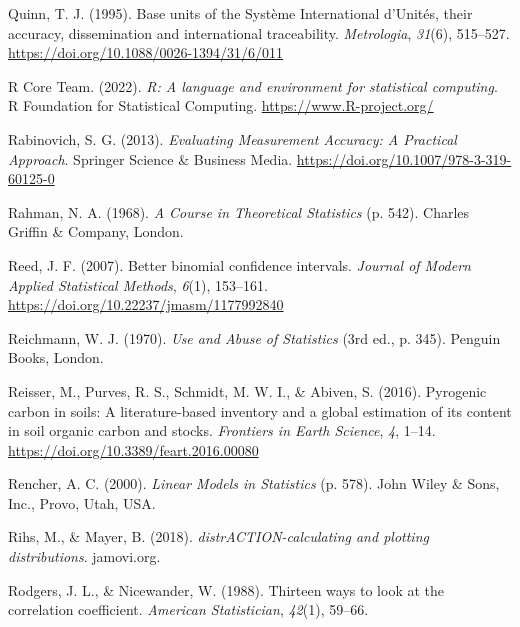 \documentclass[
  openany]{krantz}
\newlength{\cslhangindent}
\newlength{\cslentryspacingunit} %
\newenvironment{CSLReferences}[2] %
 {%
  \setlength{\parindent}{0pt}
  \ifodd #1
  \let\oldpar\par
  \def\par{\hangindent=\cslhangindent\oldpar}
  \fi
  \setlength{\parskip}{#2\cslentryspacingunit}
 }%
 {}
\begin{document}
\begin{CSLReferences}{1}{0}
\leavevmode{}%
Quinn, T. J. (1995). {Base units of the Syst{è}me International d'Unit{é}s, their accuracy, dissemination and international traceability}. \emph{Metrologia}, \emph{31}(6), 515--527. \url{https://doi.org/10.1088/0026-1394/31/6/011}

\leavevmode{}%
R Core Team. (2022). \emph{R: A language and environment for statistical computing}. R Foundation for Statistical Computing. \url{https://www.R-project.org/}

\leavevmode{}%
Rabinovich, S. G. (2013). \emph{{Evaluating Measurement Accuracy: A Practical Approach}}. Springer Science \& Business Media. \url{https://doi.org/10.1007/978-3-319-60125-0}

\leavevmode{}%
Rahman, N. A. (1968). \emph{{A Course in Theoretical Statistics}} (p. 542). Charles Griffin \& Company, London.

\leavevmode{}%
Reed, J. F. (2007). {Better binomial confidence intervals}. \emph{Journal of Modern Applied Statistical Methods}, \emph{6}(1), 153--161. \url{https://doi.org/10.22237/jmasm/1177992840}

\leavevmode{}%
Reichmann, W. J. (1970). \emph{{Use and Abuse of Statistics}} (3rd ed., p. 345). Penguin Books, London.

\leavevmode{}%
Reisser, M., Purves, R. S., Schmidt, M. W. I., \& Abiven, S. (2016). {Pyrogenic carbon in soils: A literature-based inventory and a global estimation of its content in soil organic carbon and stocks}. \emph{Frontiers in Earth Science}, \emph{4}, 1--14. \url{https://doi.org/10.3389/feart.2016.00080}

\leavevmode{}%
Rencher, A. C. (2000). \emph{{Linear Models in Statistics}} (p. 578). John Wiley \& Sons, Inc., Provo, Utah, USA.

\leavevmode{}%
Rihs, M., \& Mayer, B. (2018). \emph{distrACTION-calculating and plotting distributions}. {jamovi.org}.

\leavevmode{}%
Rodgers, J. L., \& Nicewander, W. (1988). {Thirteen ways to look at the correlation coefficient}. \emph{American Statistician}, \emph{42}(1), 59--66.


\end{CSLReferences}
\end{document}
